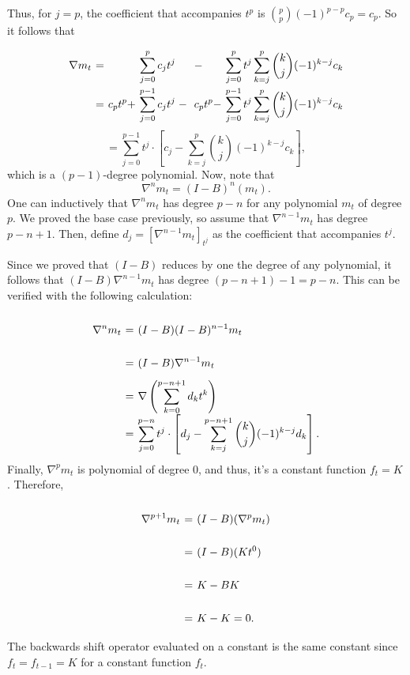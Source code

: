 Thus, for $j = p$, the coefficient that accompanies $t^p$ is $\binom{p}{p}(-1)^{p-p} c_p = c_p$. So it follows that
\[ \everymath{\displaystyle}
\arraycolsep=1.8pt\def\arraystretch{2.5}
\begin{array}{rcllll}
    \nabla m_t & = &  & \sum_{j = 0}^{p}c_j t^{j}  & - & \sum_{j = 0}^{p} t^j \sum_{k = j}^{p} \binom{k}{j} (-1)^{k-j} c_k\\
    & = & c_p t^p + & \sum_{j = 0}^{p-1}c_j t^{j} \; - \; & c_p t^p - & \sum_{j = 0}^{p-1} t^j \sum_{k = j}^{p} \binom{k}{j} (-1)^{k-j} c_k\\
\end{array}  \]
\[ = \sum_{j = 0}^{p-1} t^j \cdot \left[ c_j - \sum_{k = j}^{p} \binom{k}{j} (-1)^{k-j} c_k \right], \]
which is a $(p-1)$-degree polynomial. Now, note that
\[ \nabla^{n} m_{t} = (I-B)^{n}(m_t). \]
One can inductively that $\nabla^n m_t$ has degree $p-n$ for any polynomial $m_t$ of degree $p$. We proved the base case previously, so assume that $\nabla^{n-1} m_t$ has degree $p-n+1$. Then, define $d_j = [\nabla^{n-1} m_t]_{t^j}$ as the coefficient that accompanies $t^j$. 

Since we proved that $(I-B)$ reduces by one the degree of any polynomial, it follows that $(I-B) \nabla^{n-1} m_t$ has degree $(p-n+1)-1 = p-n$. This can be verified with the following calculation:
\[ \everymath{\displaystyle}
\arraycolsep=1.8pt\def\arraystretch{2.5}
\begin{array}{rcl}
    \nabla^{n} m_t & = & (I-B) (I-B)^{n-1} m_t\\
    & = & (I-B) \nabla^{n-1} m_t\\
    & = & \nabla \left( \sum_{k = 0}^{p-n+1} d_k t^k \right)\\
    & = & \sum_{j = 0}^{p-n} t^j \cdot \left[ d_j - \sum_{k = j}^{p-n+1} \binom{k}{j} (-1)^{k-j} d_k \right].
\end{array} \] 
Finally, $\nabla^{p}m_t$ is polynomial of degree 0, and thus, it's a constant function $f_t = K$. Therefore,
\[ \everymath{\displaystyle}
\arraycolsep=1.8pt\def\arraystretch{2.5}
\begin{array}{rcl}
    \nabla^{p+1} m_t & = & (I-B) (\nabla^{p}m_t)\\
    & = & (I-B) (Kt^0)\\
    & = & K - BK\\
    & = & K - K = 0.
\end{array} \]
The backwards shift operator evaluated on a constant is the same constant since $f_t = f_{t-1} = K$ for a constant function $f_t$.
